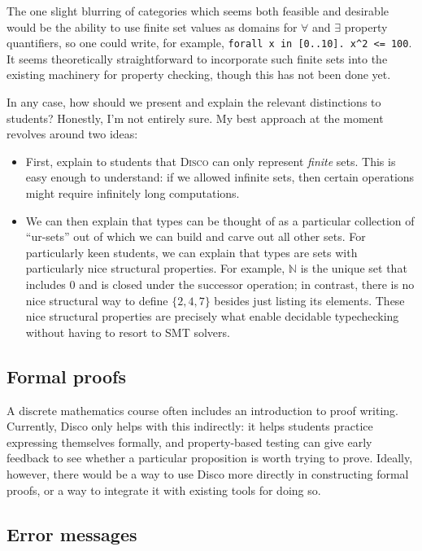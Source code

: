 \documentclass[copyright,creativecommons]{eptcs}
\newcommand{\disco}{\textsc{Disco}\xspace}
\newcommand{\N}{\mathbb{N}}
\begin{document}
The one slight blurring of categories which seems both feasible and
desirable would be the ability to use finite set values as domains for
$\forall$ and $\exists$ property quantifiers, so one could write, for
example, \texttt{forall x in [0..10]. x^2 <= 100}.  It seems
theoretically straightforward to incorporate such finite sets into the
existing machinery for property checking, though this has not been
done yet.

In any case, how should we present and explain the relevant
distinctions to students?  Honestly, I'm not entirely sure.  My best
approach at the moment revolves around two ideas:
\begin{itemize}
\item First, explain to students that \disco can only represent
  \emph{finite} sets.  This is easy enough to understand: if we
  allowed infinite sets, then certain operations might require
  infinitely long computations.
\item We can then explain that types can be thought of as a particular
  collection of ``ur-sets'' out of which we can build and carve out
  all other sets.  For particularly keen students, we can explain that
  types are sets with particularly nice structural properties.  For
  example, $\N$ is the unique set that includes $0$ and is closed
  under the successor operation; in contrast, there is no nice
  structural way to define $\{2,4,7\}$ besides just listing its
  elements.  These nice structural properties are precisely what
  enable decidable typechecking without having to resort to SMT
  solvers.
\end{itemize}

\subsection{Formal proofs}
\label{sec:formal-proof}

A discrete mathematics course often includes an introduction to proof
writing.  Currently, Disco only helps with this indirectly: it helps
students practice expressing themselves formally, and property-based
testing can give early feedback to see whether a particular
proposition is worth trying to prove.  Ideally, however, there would
be a way to use Disco more directly in constructing formal proofs, or
a way to integrate it with existing tools for doing so.

\subsection{Error messages}
\label{sec:errors}
\end{document}
